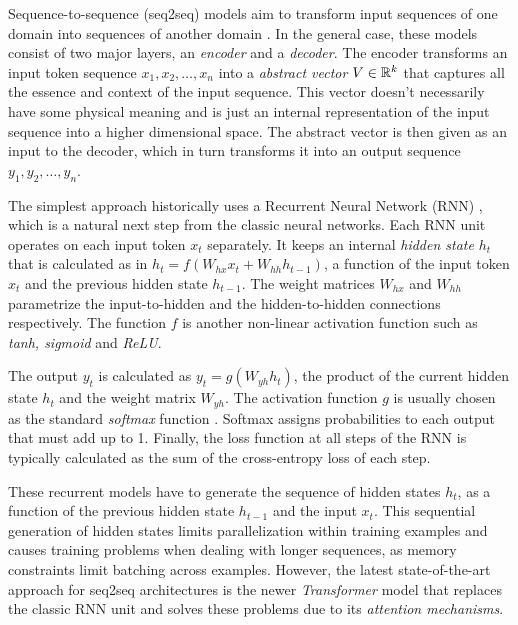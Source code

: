 Sequence-to-sequence (seq2seq) models aim to transform input sequences of one
domain into sequences of another domain \citep{Sutskever_2014}. In the general
case, these models consist of two major layers, an \emph{encoder} and a
\emph{decoder}. The encoder transforms an input token sequence $x_1, x_2, \dots,
x_n$ into a \emph{abstract vector} $V \in \mathbb{R}^k$ that captures all the essence
and context of the input sequence. This vector doesn't necessarily have some
physical meaning and is just an internal representation of the input sequence
into a higher dimensional space. The abstract vector is then given as an input
to the decoder, which in turn transforms it into an output sequence $y_1, y_2,
\dots, y_n$.


The simplest approach historically uses a Recurrent Neural Network (RNN)
\citep{Rumelhart1986, Werbos1990, Hochreiter_1997}, which is a natural next step
from the classic neural networks. Each RNN unit operates on each input token
$x_t$ separately. It keeps an internal \emph{hidden state} $h_t$ that is
calculated as in $h_t = f(W_{hx} x_t + W_{hh} h_{t-1})$, a function of the input
token $x_t$ and the previous hidden state $h_{t-1}$. The weight matrices
$W_{hx}$ and $W_{hh}$ parametrize the input-to-hidden and the hidden-to-hidden
connections respectively. The function $f$ is another non-linear activation
function such as \emph{tanh, sigmoid} and \emph{ReLU}.

The output $y_t$ is calculated as $y_t = g(W_{yh} h_t)$, \ie the product of the
current hidden state $h_t$ and the weight matrix $W_{yh}$. The activation
function $g$ is usually chosen as the standard \emph{softmax} function
\citep{Nielsen2015-pu, Goodfellow-et-al-2016, Bishop-book-2006}. Softmax assigns
probabilities to each output that must add up to 1.
Finally, the loss function at all steps of the RNN is typically calculated as
the sum of the cross-entropy loss of each step.

These recurrent models have to generate the sequence of hidden states $h_t$, as
a function of the previous hidden state $h_{t-1}$ and the input $x_t$. This
sequential generation of hidden states limits parallelization within training
examples and causes training problems when dealing with longer sequences, as
memory constraints limit batching across examples. However, the latest
state-of-the-art approach for seq2seq architectures is the newer
\emph{Transformer} model \citep{Vaswani_2017} that replaces the classic RNN unit
and solves these problems due to its \emph{attention mechanisms}.


